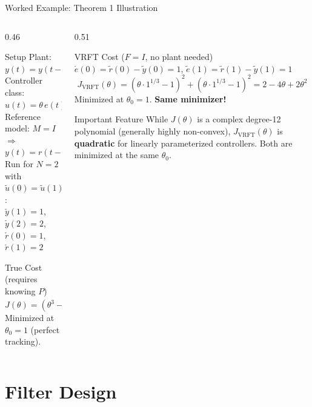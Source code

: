 \documentclass[aspectratio=169]{beamer}
\newcommand{\highlight}[1]{{\color{accentgreen!70!black}\textbf{#1}}}
\newcommand{\JJ}{J_{\mathrm{VRFT}}}
\newcommand{\Jopt}{J}
\begin{document}
\begin{frame}{Worked Example: Theorem 1 Illustration}
  \begin{columns}[T]
    \begin{column}{0.46\textwidth}
      \begin{exampleblock}{Setup}
        Plant: $y(t) = y(t-1) + u(t-1)^3$\\
        Controller class: $u(t) = \theta\, e(t)^{1/3}$\\
        Reference model: $M = I$ \; $\Rightarrow$ $y(t) = r(t-1)$\\[0.4em]
        Run for $N=2$ with $\tilde{u}(0)=\tilde{u}(1)=1$:\\
        $\tilde{y}(1)=1$, $\tilde{y}(2)=2$, $\tilde{r}(0)=1$, $\tilde{r}(1)=2$
      \end{exampleblock}
      \vspace{0.3em}
      \begin{block}{True Cost (requires knowing $P$)}
        \[
          \Jopt(\theta) = (\theta^3-1)^2 + (3\theta^3-\theta^6-2)^2
        \]
        Minimized at $\theta_0 = 1$ (perfect tracking).
      \end{block}
    \end{column}
    \begin{column}{0.51\textwidth}
      \begin{block}{VRFT Cost ($F=I$, no plant needed)}
        $\tilde{e}(0)=\tilde{r}(0)-\tilde{y}(0)=1$, $\tilde{e}(1)=\tilde{r}(1)-\tilde{y}(1)=1$
        \[
          \JJ(\theta) = (\theta \cdot 1^{1/3}-1)^2 + (\theta \cdot 1^{1/3}-1)^2 = 2-4\theta+2\theta^2
        \]
        Minimized at $\theta_0 = 1$. \highlight{Same minimizer!}
      \end{block}
      \vspace{0.3em}
      \begin{alertblock}{Important Feature}
        While $\Jopt(\theta)$ is a complex degree-12 polynomial (generally highly non-convex), $\JJ(\theta)$ is \highlight{quadratic} for linearly parameterized controllers. Both are minimized at the same $\theta_0$.
      \end{alertblock}
    \end{column}
  \end{columns}
\end{frame}

\section{Filter Design}
\end{document}
